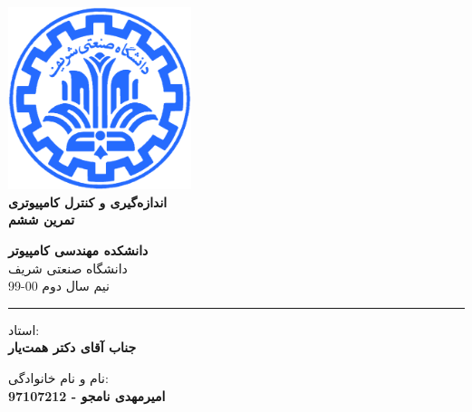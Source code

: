 \documentclass[12pt]{article}
\begin{document}
\begin{titlepage}
\begin{center}
        
\vspace*{0.7cm}

\includegraphics[width=0.4\textwidth]{sharif1.png}\\
\vspace{0.5cm}
\textbf{ \Huge{\emph ‌اندازه‌گیری و کنترل کامپیوتری} }\\
\vspace{0.5cm}
\textbf{ \Large{ تمرین ششم} }
\vspace{0.2cm}
       
 
      \large \textbf{دانشکده مهندسی کامپیوتر}\\\vspace{0.2cm}
    \large   دانشگاه صنعتی شریف\\\vspace{0.2cm}
       \large   ﻧﯿﻢ سال دوم 00-99 \\\vspace{0.2cm}
      \noindent\rule[1ex]{\linewidth}{1pt}
استاد:\\
    \textbf{{جناب آقای دکتر همت‌یار}}


    \vspace{0.15cm}
نام و نام خانوادگی:\\

       
    \textbf{{امیرمهدی نامجو - 97107212}}
\end{center}
\end{titlepage}


\newpage
\pagestyle{fancy}
\fancyhf{}
\fancyfoot{}
\cfoot{\thepage}
\end{document}
